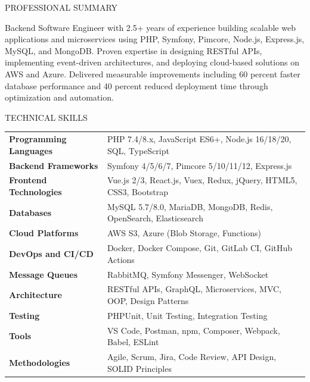 \documentclass{resume} %
\begin{document}

\begin{rSection}{PROFESSIONAL SUMMARY}

{Backend Software Engineer with 2.5+ years of experience building scalable web applications and microservices using PHP, Symfony, Pimcore, Node.js, Express.js, MySQL, and MongoDB. Proven expertise in designing RESTful APIs, implementing event-driven architectures, and deploying cloud-based solutions on AWS and Azure. Delivered measurable improvements including 60 percent faster database performance and 40 percent reduced deployment time through optimization and automation.}

\end{rSection}


\begin{rSection}{TECHNICAL SKILLS}

\begin{tabular}{ @{} >{\bfseries}l @{\hspace{6ex}} l }
Programming Languages & PHP 7.4/8.x, JavaScript ES6+, Node.js 16/18/20, SQL, TypeScript\\
Backend Frameworks & Symfony 4/5/6/7, Pimcore 5/10/11/12, Express.js\\
Frontend Technologies & Vue.js 2/3, React.js, Vuex, Redux, jQuery, HTML5, CSS3, Bootstrap\\
Databases & MySQL 5.7/8.0, MariaDB, MongoDB, Redis, OpenSearch, Elasticsearch\\
Cloud Platforms & AWS S3, Azure (Blob Storage, Functions)\\
DevOps and CI/CD & Docker, Docker Compose, Git, GitLab CI, GitHub Actions\\
Message Queues & RabbitMQ, Symfony Messenger, WebSocket\\
Architecture & RESTful APIs, GraphQL, Microservices, MVC, OOP, Design Patterns\\
Testing & PHPUnit, Unit Testing, Integration Testing\\
Tools & VS Code, Postman, npm, Composer, Webpack, Babel, ESLint\\
Methodologies & Agile, Scrum, Jira, Code Review, API Design, SOLID Principles\\
\end{tabular}

\end{rSection}
\end{document}
